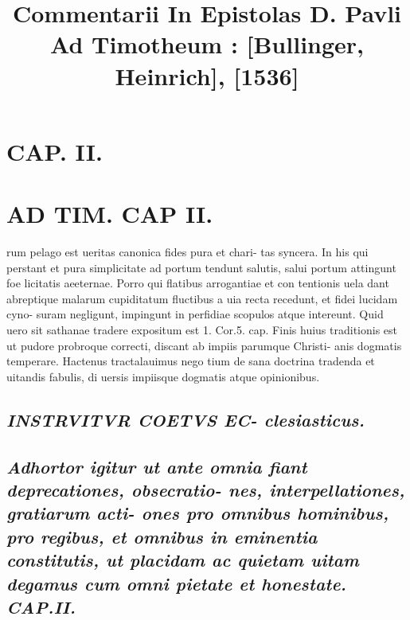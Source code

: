 \documentclass{article}
\begin{document}
\date{}
        \title{Commentarii In Epistolas D. Pavli Ad Timotheum : [Bullinger, Heinrich], [1536]}
\maketitle
\tableofcontents
\clearpage
\begin{pages} 
\beginnumbering
\section{CAP. II.}
\section*{AD TIM. CAP II. }
\marginpar{[ p.107 ]}\pstart rum pelago est ueritas canonica fides pura et chari- tas syncera. In his qui perstant et pura simplicitate ad portum tendunt salutis, salui portum attingunt foe licitatis aeeternae. Porro qui flatibus arrogantiae et con tentionis uela dant abreptique malarum cupiditatum fluctibus a uia recta recedunt, et fidei lucidam cyno- suram negligunt, impingunt in perfidiae scopulos atque intereunt. Quid uero sit sathanae tradere expositum est 1. Cor.5. cap. Finis huius traditionis est ut pudore probroque correcti, discant ab impiis parumque Christi- anis dogmatis temperare. Hactenus tractalauimus nego tium de sana doctrina tradenda et uitandis fabulis, di uersis impiisque dogmatis atque opinionibus.  \pend 
{}
{}
\subsection*{\textit{INSTRVITVR COETVS EC- clesiasticus. }} 
{}
\subsection*{\textit{Adhortor igitur ut ante omnia fiant deprecationes, obsecratio- nes, interpellationes, gratiarum acti- ones pro omnibus hominibus, pro regibus, et omnibus in eminentia constitutis, ut placidam ac quietam uitam degamus cum omni pietate et honestate. CAP.II. }}

\end{pages}
\end{document}
